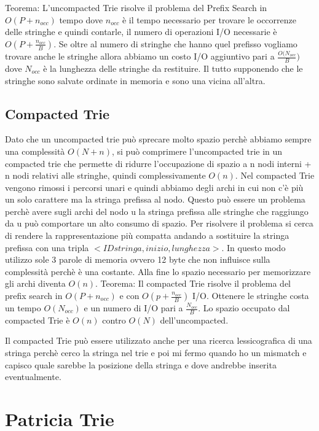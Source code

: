 \documentclass[14pt]{extreport}
\begin{document}
Teorema: L'uncompacted Trie risolve il problema del Prefix Search in $O(P+n_{occ})$ tempo dove $n_{occ}$ è il tempo necessario per trovare le occorrenze delle stringhe e quindi contarle, il numero di operazioni I/O necessarie è $O(P+\frac{n_{occ}}{B})$. Se oltre al numero di stringhe che hanno quel prefisso vogliamo trovare anche le stringhe allora abbiamo un costo I/O aggiuntivo pari a $\frac{O(N_{occ}}{B})$ dove $N_{occ}$ è la lunghezza delle stringhe da restituire.
Il tutto supponendo che le stringhe sono salvate ordinate in memoria e sono una vicina all'altra.

\subsection{Compacted Trie}

Dato che un uncompacted trie può sprecare molto spazio perchè abbiamo sempre una complessità $O(N+n)$, si può comprimere l'uncompacted trie in un compacted trie che permette di ridurre l'occupazione di spazio a n nodi interni + n nodi relativi alle stringhe, quindi complessivamente $O(n)$.
Nel compacted Trie vengono rimossi i percorsi unari e quindi abbiamo degli archi in cui non c'è più un solo carattere ma la stringa prefissa al nodo. Questo può essere un problema perchè avere sugli archi del nodo u la stringa prefissa alle stringhe che raggiungo da u può comportare un alto consumo di spazio.
Per risolvere il problema si cerca di rendere la rappresentazione più compatta andando a sostituire la stringa prefissa con una tripla $<ID stringa, inizio, lunghezza>$.
In questo modo utilizzo sole 3 parole di memoria ovvero 12 byte che non influisce sulla complessità perchè è una costante.
Alla fine lo spazio necessario per memorizzare gli archi diventa $O(n)$.
Teorema: Il compacted Trie risolve il problema del prefix search in $O(P+n_{occ})$ e con $O(p+\frac{n_{occ}}{B})$ I/O.
Ottenere le stringhe costa un tempo $O(N_{occ})$ e un numero di I/O pari a $\frac{N_{occ}}{B}$. Lo spazio occupato dal compacted Trie è $O(n)$ contro $O(N)$ dell'uncompacted.

Il compacted Trie può essere utilizzato anche per una ricerca lessicografica di una stringa perchè cerco la stringa nel trie e poi mi fermo quando ho un mismatch e capisco quale sarebbe la posizione della stringa e dove andrebbe inserita eventualmente.

\section{Patricia Trie}
\end{document}
